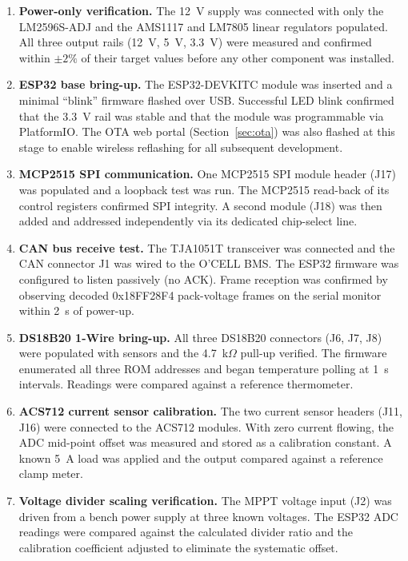 \begin{enumerate}
    \item \textbf{Power-only verification.} The 12~V supply was connected with only the LM2596S-ADJ and the AMS1117 and LM7805 linear regulators populated. All three output rails (12~V, 5~V, 3.3~V) were measured and confirmed within $\pm 2\%$ of their target values before any other component was installed.

    \item \textbf{ESP32 base bring-up.} The ESP32-DEVKITC module was inserted and a minimal ``blink'' firmware flashed over USB. Successful LED blink confirmed that the 3.3~V rail was stable and that the module was programmable via PlatformIO. The OTA web portal (Section~\ref{sec:ota}) was also flashed at this stage to enable wireless reflashing for all subsequent development.

    \item \textbf{MCP2515 SPI communication.} One MCP2515 SPI module header (J17) was populated and a loopback test was run. The MCP2515 read-back of its control registers confirmed SPI integrity. A second module (J18) was then added and addressed independently via its dedicated chip-select line.

    \item \textbf{CAN bus receive test.} The TJA1051T transceiver was connected and the CAN connector J1 was wired to the O'CELL BMS. The ESP32 firmware was configured to listen passively (no ACK). Frame reception was confirmed by observing decoded 0x18FF28F4 pack-voltage frames on the serial monitor within 2~s of power-up.

    \item \textbf{DS18B20 1-Wire bring-up.} All three DS18B20 connectors (J6, J7, J8) were populated with sensors and the 4.7~k$\Omega$ pull-up verified. The firmware enumerated all three ROM addresses and began temperature polling at 1~s intervals. Readings were compared against a reference thermometer.

    \item \textbf{ACS712 current sensor calibration.} The two current sensor headers (J11, J16) were connected to the ACS712 modules. With zero current flowing, the ADC mid-point offset was measured and stored as a calibration constant. A known 5~A load was applied and the output compared against a reference clamp meter.

    \item \textbf{Voltage divider scaling verification.} The MPPT voltage input (J2) was driven from a bench power supply at three known voltages. The ESP32 ADC readings were compared against the calculated divider ratio and the calibration coefficient adjusted to eliminate the systematic offset.


\end{enumerate}

